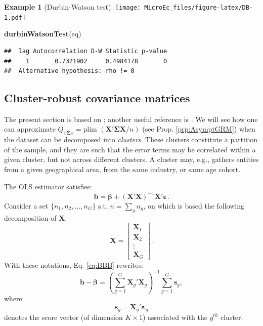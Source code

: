 \documentclass[
  12pt,
]{book}
\newenvironment{Shaded}{\begin{snugshade}}{\end{snugshade}}
\newcommand{\FunctionTok}[1]{\textcolor[rgb]{0.13,0.29,0.53}{\textbf{#1}}}
\newcommand{\NormalTok}[1]{#1}
\theoremstyle{definition}
\theoremstyle{definition}
\newtheorem{example}{Example}[chapter]
\theoremstyle{definition}
\theoremstyle{definition}
\theoremstyle{remark}
\begin{document}
\begin{example}[Durbin-Watson test]
\texttt{[image: MicroEc\_files/figure-latex/DB-1.pdf]}

\begin{Shaded}
\begin{Highlighting}[]
\FunctionTok{durbinWatsonTest}\NormalTok{(eq)}
\end{Highlighting}
\end{Shaded}

\begin{verbatim}
##  lag Autocorrelation D-W Statistic p-value
##    1       0.7321902     0.4984178       0
##  Alternative hypothesis: rho != 0
\end{verbatim}

\end{example}

\hypertarget{Clusters}{%
\subsection{Cluster-robust covariance matrices}\label{Clusters}}

The present section is based on \citet{MACKINNON2022}; another useful reference is \citet{Cameron_Miller_2014}. We will see how one can approximate \(Q_{x\boldsymbol\Sigma x}=\mbox{plim }(\mathbf{X}'\boldsymbol\Sigma\mathbf{X}/n)\) (see Prop. \ref{prp:AsymptGRM}) when the dataset can be decomposed into \emph{clusters}. These clusters constitute a partition of the sample, and they are such that the error terms may be correlated within a given cluster, but not across different clusters. A cluster may, e.g., gathers entities from a given geographical area, from the same industry, or same age cohort.

The OLS estimator satisfies:
\begin{equation}
\mathbf{b} = \boldsymbol\beta + (\mathbf{X}'\mathbf{X})^{-1}\mathbf{X}'\boldsymbol\varepsilon.\label{eq:BBB}
\end{equation}
Consider a set \(\{n_1,n_2,\dots,n_G\}\) s.t. \(n=\sum_g n_g\), on which is based the following decomposition of \(\mathbf{X}\):
\[
\mathbf{X} = \left[
\begin{array}{c}
\mathbf{X}_1 \\
\mathbf{X}_2 \\
\vdots\\
\mathbf{X}_G
\end{array}
\right].
\]
With these notations, Eq. \eqref{eq:BBB} rewrites:
\begin{equation}
\mathbf{b} - \boldsymbol\beta = \left(\sum_{g=1}^G \mathbf{X}_g'\mathbf{X}_g\right)^{-1}\sum_{g=1}^G \mathbf{s}_g,\label{eq:cluster1}
\end{equation}
where
\begin{equation}
\mathbf{s}_g = \mathbf{X}_g'\boldsymbol\varepsilon_g \label{eq:definiS}
\end{equation}
denotes the score vector (of dimension \(K \times 1\)) associated with the \(g^{th}\) cluster.
\end{document}

